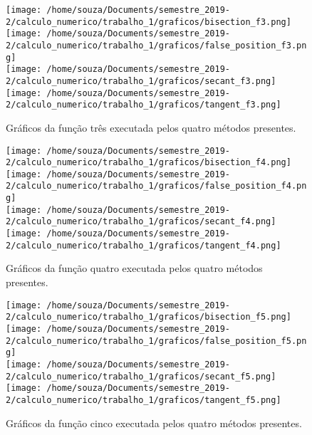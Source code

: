 \documentclass[12pt]{article}
\begin{document}
\begin{figure}[!h]
    \centering
    \texttt{[image: /home/souza/Documents/semestre\_2019-2/calculo\_numerico/trabalho\_1/graficos/bisection\_f3.png]}
    \texttt{[image: /home/souza/Documents/semestre\_2019-2/calculo\_numerico/trabalho\_1/graficos/false\_position\_f3.png]}\\
    \texttt{[image: /home/souza/Documents/semestre\_2019-2/calculo\_numerico/trabalho\_1/graficos/secant\_f3.png]}
    \texttt{[image: /home/souza/Documents/semestre\_2019-2/calculo\_numerico/trabalho\_1/graficos/tangent\_f3.png]}
    \caption{Gráficos da função três executada pelos quatro métodos presentes.}
\end{figure}

\begin{figure}[!h]
    \centering
    \texttt{[image: /home/souza/Documents/semestre\_2019-2/calculo\_numerico/trabalho\_1/graficos/bisection\_f4.png]}
    \texttt{[image: /home/souza/Documents/semestre\_2019-2/calculo\_numerico/trabalho\_1/graficos/false\_position\_f4.png]}\\
    \texttt{[image: /home/souza/Documents/semestre\_2019-2/calculo\_numerico/trabalho\_1/graficos/secant\_f4.png]}
    \texttt{[image: /home/souza/Documents/semestre\_2019-2/calculo\_numerico/trabalho\_1/graficos/tangent\_f4.png]}
    \caption{Gráficos da função quatro executada pelos quatro métodos presentes.}
\end{figure}

\begin{figure}[!h]
    \centering
    \texttt{[image: /home/souza/Documents/semestre\_2019-2/calculo\_numerico/trabalho\_1/graficos/bisection\_f5.png]}
    \texttt{[image: /home/souza/Documents/semestre\_2019-2/calculo\_numerico/trabalho\_1/graficos/false\_position\_f5.png]}\\
    \texttt{[image: /home/souza/Documents/semestre\_2019-2/calculo\_numerico/trabalho\_1/graficos/secant\_f5.png]}
    \texttt{[image: /home/souza/Documents/semestre\_2019-2/calculo\_numerico/trabalho\_1/graficos/tangent\_f5.png]}
    \caption{Gráficos da função cinco executada pelos quatro métodos presentes.}
\end{figure}
\end{document}
